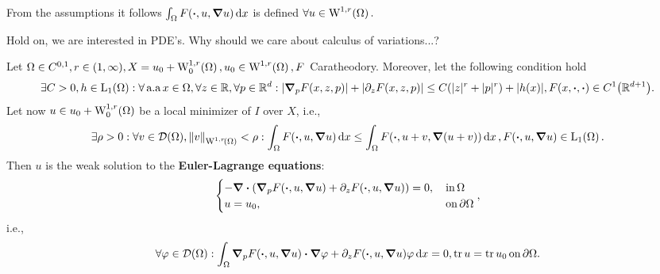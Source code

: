 \documentclass{article}
\begin{document}
\begin{remark}
	From the assumptions it follows $\int_{\Omega}F\qty(\vdot, u, \grad u)\dd{x}$ is defined $\forall u \in \WkpSet[1][r]{\Omega}.$
\end{remark}

Hold on, we are interested in PDE's. Why should we care about calculus of variations...?

\begin{lemma}
	Let $\Omega \in C^{0,1}, r \in(1,\infty), X = u_0 + \WkpzeroSet[1][r]{\Omega}, u_0 \in \WkpSet[1][r]{\Omega}, F$ Caratheodory. Moreover, let the following condition hold
	\[
		\exists C>0, h \in \LpSet[1]{\Omega}: \forall \, \text{a.a} \, x \in \Omega, \forall z \in \R, \forall p \in \R^d: |\grad_p F(x,z,p)|+|\partial_{z} F(x,z,p)| \leq C\qty(|z|^r + |p|^r)+ |h(x)|, F(x,\vdot, \vdot) \in C^1\qty(\R^{d+1}).
	\]
	Let now $u \in u_0 + \WkpzeroSet[1][r]{\Omega}$ be a local minimizer of $I$ over $X$, i.e.,
	\[
		\exists \rho>0: \forall v \in \mathcal{D}\qty(\Omega), \norm{v}_{\WkpSet[1][r]{\Omega}} < \rho: \int_{\Omega}F\qty(\vdot, u, \grad u)\dd{x} \leq \int_{\Omega}F\qty(\vdot, u+v, \grad\qty(u+v))\dd{x}, F\qty(\vdot, u, \grad u) \in \LpSet[1]{\Omega}.
	\]
	Then $u$ is the weak solution to the \textbf{Euler-Lagrange equations}:
	\[
		\begin{cases}
			- \divergence{\qty(\grad_p F\qty(\vdot, u, \grad u)+ \partial_{z}F\qty(\vdot, u, \grad u))} = 0, & \, \text{in} \, \Omega \\
			u = u_0, & \, \text{on} \, \partial \Omega
		\end{cases},
	\]
	i.e.,
	\[
		\forall \varphi \in \mathcal{D}\qty(\Omega): \int_{\Omega}\grad_p F\qty(\vdot, u, \grad u) \vdot \grad \varphi + \partial_{z}F\qty(\vdot, u, \grad u) \varphi \dd{x} = 0, \tr u = \tr u_0 \, \text{on} \, \partial \Omega.
	\]
\end{lemma}
\end{document}
